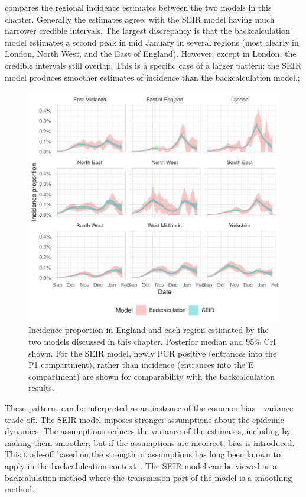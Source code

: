 \documentclass[thesis.tex]{subfiles}
\begin{document}
 compares the regional incidence estimates between the two models in this chapter.
Generally the estimates agree, with the SEIR model having much narrower credible intervals.
The largest discrepancy is that the backcalculation model estimates a second peak in mid January in several regions (most clearly in London, North West, and the East of England).
However, except in London, the credible intervals still overlap.
This is a specific case of a larger pattern: the SEIR model produces smoother estimates of incidence than the backcalculation model.;
\begin{figure}
    \centering \includegraphics{transmission/compare-regions}
    \caption[Comparing each models estimate of regional incidence.]{%
        Incidence proportion in England and each region estimated by the two models discussed in this chapter.
        Posterior median and 95\% CrI shown.
        For the SEIR model, newly PCR positive (entrances into the P1 compartment), rather than incidence (entrances into the E compartment) are shown for comparability with the backcalculation results.
    }
    \label{transmission:fig:compare-regions}
\end{figure}

These patterns can be interpreted as an instance of the common bias---variance trade-off.
The SEIR model imposes stronger assumptions about the epidemic dynamics.
The assumptions reduces the variance of the estimates, including by making them smoother, but if the assumptions are incorrect, bias is introduced.
This trade-off based on the strength of assumptions has long been known to apply in the backcalulcation context~\autocite[e.g.][section 8.3]{brookmeyerBackcalculation}.
The SEIR model can be viewed as a backcalulation method where the transmisson part of the model is a smoothing method.
\end{document}

